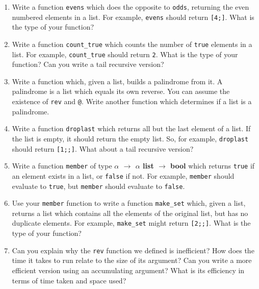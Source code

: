 \documentclass[]{book}
\begin{document}
\begin{enumerate}
  \item Write a function \texttt{evens} which does the opposite to \texttt{odds}, returning the even numbered elements in a list. For example, \texttt{evens\! [2;\! 4;\! 2;\! 4;\! 2]} should return \texttt{[4;]}. What is the type of your function?
  \item Write a function \texttt{count\_true} which counts the number of \texttt{true} elements in a list. For example, \texttt{count\_true} should return \texttt{2}. What is the type of your function? Can you write a tail recursive version?
  \item Write a function which, given a list, builds a palindrome from it. A palindrome is a list which equals its own reverse. You can assume the existence of \texttt{rev} and \texttt{@}. Write another function which determines if a list is a palindrome.
  \item Write a function \texttt{droplast} which returns all but the last element of a list. If the list is empty, it should return the empty list. So, for example, \texttt{droplast\! [1;\! 2;\! 4;\! 8]} should return \texttt{[1;;]}. What about a tail recursive version?
  \item Write a function \texttt{member} of type \textbf{\textsf {$\alpha$ $\rightarrow$ $\alpha$ list $\rightarrow$ bool}} which returns \texttt{true} if an element exists in a list, or \texttt{false} if not. For example, \texttt{member\! [1;\! 2;\! 3]} should evaluate to \texttt{true}, but \texttt{member\! [1;\! 2]} should evaluate to \texttt{false}. 
  \item Use your \texttt{member} function to write a function \texttt{make\_set} which, given a list, returns a list which contains all the elements of the original list, but has no duplicate elements. For example, \texttt{make\_set\! [1;\! 2;\! 3;\! 3;\! 1]} might return \texttt{[2;;]}. What is the type of your function?
  \item Can you explain why the \texttt{rev} function we defined is inefficient? How does the time it takes to run relate to the size of its argument? Can you write a more efficient version using an accumulating argument? What is its efficiency in terms of time taken and space used?
\end{enumerate}

\cleardoublepage
\thispagestyle{empty}
\\
\end{document}
